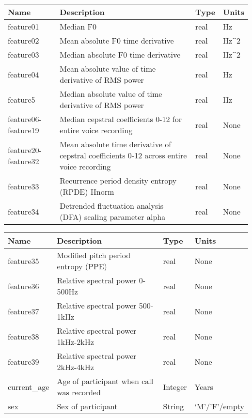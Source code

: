 \begin{tabularx}{1\textwidth} { 
		| >{\raggedright\arraybackslash}X 
		| >{\raggedright\arraybackslash}X 
		| >{\raggedright\arraybackslash}X 
		| >{\raggedright\arraybackslash}X |}
	\hline
	\textbf{Name} & \textbf{Description} & \textbf{Type} & \textbf{Units} \\
	\hline
	feature01  & Median F0  & real & Hz  \\
	\hline
	feature02  & Mean absolute F0 time derivative  & real & Hz^2 \\
	\hline
	feature03  & Median absolute F0 time derivative  & real & Hz^2  \\
	\hline
	feature04  & Mean absolute value of time derivative of RMS power  & real & Hz  \\
	\hline
	feature5  &Median absolute value of time derivative of RMS power  & real & Hz  \\
	\hline
	feature06-feature19  & Median cepstral coefficients 0-12 for entire voice recording  & real & None  \\
	\hline
	feature20-feature32  & Mean absolute time derivative of cepstral coefficients 0-12 across entire voice recording  & real & None  \\
	\hline
	feature33  & Recurrence period density entropy (RPDE) Hnorm  & real & None  \\
	\hline
	feature34  & Detrended fluctuation analysis (DFA) scaling parameter alpha  & real & None  \\
	\hline
\end{tabularx}

\begin{tabularx}{1\textwidth} { 
		| >{\raggedright\arraybackslash}X 
		| >{\raggedright\arraybackslash}X 
		| >{\raggedright\arraybackslash}X 
		| >{\raggedright\arraybackslash}X |}
	\hline
	\textbf{Name} & \textbf{Description} & \textbf{Type} & \textbf{Units} \\
	\hline
	\hline
		feature35  & Modified pitch period entropy (PPE)  & real & None  \\
	\hline
	feature36  & Relative spectral power 0-500Hz  & real & None  \\
	\hline
	feature37  & Relative spectral power 500-1kHz  & real & None  \\
	\hline
	feature38  & Relative spectral power 1kHz-2kHz  & real & None  \\
	\hline
	feature39  & Relative spectral power 2kHz-4kHz  & real & None  \\
	\hline
	current\_age  & Age of participant when call was recorded  & Integer & Years  \\
	\hline
	sex  & Sex of participant  & String & ‘M’/’F’/empty  \\
	\hline
\end{tabularx}


